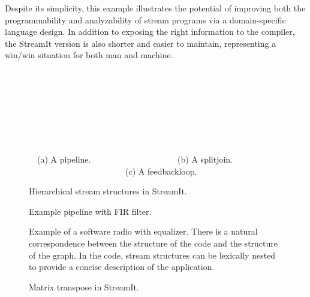 Despite its simplicity, this example illustrates the potential of
improving both the programmability and analyzability of stream
programs via a domain-specific language design.  In addition to
exposing the right information to the compiler, the StreamIt version
is also shorter and easier to maintain, representing a win/win
situation for both man and machine.

\begin{figure}[t]
\centering
\begin{minipage}{0.598in}
{\centering
{} \\
}
\end{minipage} 
\hspace{0.45in}
\begin{minipage}{1.69in}
{\centering
{} \\
}
\end{minipage}
\hspace{0.45in}
\begin{minipage}{1.326in}
{\centering
{} \\
}
\end{minipage}
\\ ~ \\ {\mbox{~}\protect\small \mbox{~}(a) A pipeline. ~~~~~~~~~~~~~~~~~~~~(b) A splitjoin. ~~~~~~~~~~~~~~~~~~~~~~~(c) A feedbackloop.~~~~~~~~}
\caption{Hierarchical stream structures in StreamIt.\protect\label{fig:structures}}
\end{figure}

\begin{figure}[t]
\centering
{}
\hspace{0.15in}
\caption{Example pipeline with FIR filter.\protect\label{fig:pipeline}}
\end{figure}

\begin{figure}[t]
\centering
{}
\caption[Example of a software radio with equalizer.]{Example of a
  software radio with equalizer.  There is a natural correspondence
  between the structure of the code and the structure of the graph.
  In the code, stream structures can be lexically nested to provide a
  concise description of the application.\protect\label{fig:fm-radio}}
\end{figure}

\begin{figure}[t]
\centering
{}
\caption{Matrix transpose in StreamIt.\protect\label{fig:transpose}}
\end{figure}

